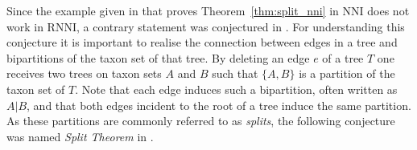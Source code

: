 \documentclass{amsart}
\newcommand{\nni}{\mathrm{NNI}}
\newcommand{\rnni}{\mathrm{RNNI}}
\begin{document}



Since the example given in \autocite{Li1996-zw} that proves Theorem~\ref{thm:split_nni} in $\nni$ does not work in $\rnni$, a contrary statement was conjectured in \autocite{Gavryushkin2018-ol}.
For understanding this conjecture it is important to realise the connection between edges in a tree and bipartitions of the taxon set of that tree.
By deleting an edge $e$ of a tree $T$ one receives two trees on taxon sets $A$ and $B$ such that $\{A,B\}$ is a partition of the taxon set of $T$.
Note that each edge induces such a bipartition, often written as $A|B$, and that both edges incident to the root of a tree induce the same partition.
As these partitions are commonly referred to as \emph{splits}, the following conjecture was named \emph{Split Theorem} in \autocite{Gavryushkin2018-ol}.
\end{document}
